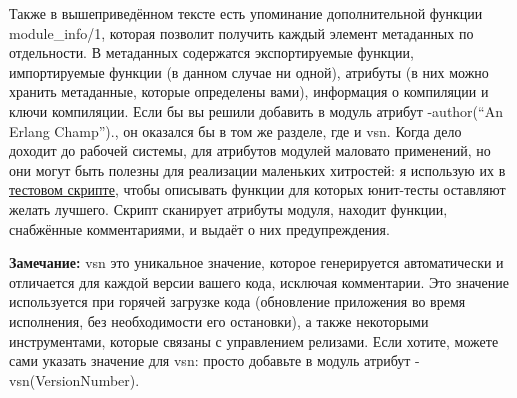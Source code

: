 \documentclass[a4paper,12pt]{report}
\newcommand{\ops}{\colorbox{lgreen}}
\begin{document}
Также в вышеприведённом тексте есть упоминание дополнительной функции \ops{module\_info/1}, которая позволит получить каждый элемент метаданных по отдельности. В метаданных содержатся экспортируемые функции, импортируемые функции (в данном случае ни одной), атрибуты (в них можно хранить метаданные, которые определены вами), информация о компиляции и ключи компиляции. Если бы вы решили добавить в модуль атрибут \ops{-author(``An Erlang Champ'').}, он оказался бы в том же разделе, где и \ops{vsn}. Когда дело доходит до рабочей системы, для атрибутов модулей маловато применений, но они могут быть полезны для реализации маленьких хитростей: я использую их в \href{http://learnyousomeerlang.com/static/erlang/tester.erl}{тестовом скрипте}, чтобы описывать функции для которых юнит\--тесты оставляют желать лучшего. Скрипт сканирует атрибуты модуля, находит функции, снабжённые комментариями, и выдаёт о них предупреждения.\\ 
\colorbox{lgray}
{
    \begin{minipage}{1\linewidth}
        \textbf{Замечание:} \ops{vsn} это уникальное значение, которое генерируется автоматически и отличается для каждой версии вашего кода, исключая комментарии. Это значение используется при горячей загрузке кода (обновление приложения во время исполнения, без необходимости его остановки), а также некоторыми инструментами, которые связаны с управлением релизами. Если хотите, можете сами указать значение для \ops{vsn}: просто добавьте в модуль атрибут \ops{-vsn(VersionNumber)}.
    \end{minipage}
}
\end{document}
